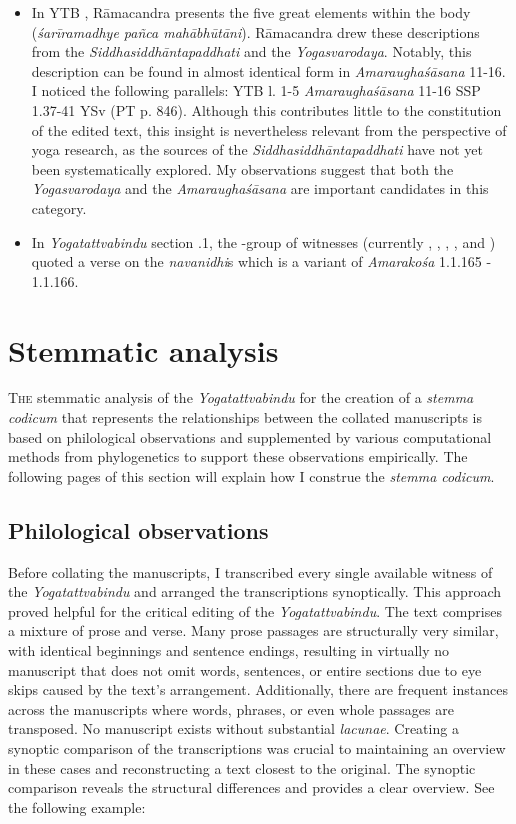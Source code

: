 \begin{itemize}
\item In YTB , Rāmacandra presents the five great elements within the body (\textit{śarīramadhye pañca mahābhūtāni}). Rāmacandra drew these descriptions from the \emph{Siddhasiddhāntapaddhati} and the \emph{Yogasvarodaya}. Notably, this description can be found in almost identical form in \emph{Amaraughaśāsana} 11-16. I noticed the following parallels: YTB  l. 1-5 \approx \emph{Amaraughaśāsana} 11-16 \approx SSP 1.37-41 \approx YSv (PT p. 846). Although this contributes little to the constitution of the edited text, this insight is nevertheless relevant from the perspective of yoga research, as the sources of the \emph{Siddhasiddhāntapaddhati} have not yet been systematically explored. My observations suggest that both the \emph{Yogasvarodaya} and the \emph{Amaraughaśāsana} are important candidates in this category.

\item In \emph{Yogatattvabindu} section .1, the \beta-group of witnesses (currently , , , , and ) quoted a verse on the \textit{navanidhi}s which is a variant of \emph{Amarakośa} 1.1.165 - 1.1.166.
  
\end{itemize}
\newpage 
\section{Stemmatic analysis}
\label{stemma}

\lettrine[lines=2, lhang=0.2, loversize=0.25]{T}{he} stemmatic analysis of the \emph{Yogatattvabindu} for the creation of a \textit{stemma codicum} that represents the relationships between the collated manuscripts is based on philological observations and supplemented by various computational methods from phylogenetics to support these observations empirically. The following pages of this section will explain how I construe the \textit{stemma codicum}. 

\subsection{Philological observations}

Before collating the manuscripts, I transcribed every single available witness of the \emph{Yogatattvabindu} and arranged the transcriptions synoptically. This approach proved helpful for the critical editing of the \emph{Yogatattvabindu}. The text comprises a mixture of prose and verse. Many prose passages are structurally very similar, with identical beginnings and sentence endings, resulting in virtually no manuscript that does not omit words, sentences, or entire sections due to eye skips caused by the text's arrangement. Additionally, there are frequent instances across the manuscripts where words, phrases, or even whole passages are transposed. No manuscript exists without substantial \textit{lacunae}. Creating a synoptic comparison of the transcriptions was crucial to maintaining an overview in these cases and reconstructing a text closest to the original. The synoptic comparison reveals the structural differences and provides a clear overview. See the following example:  

